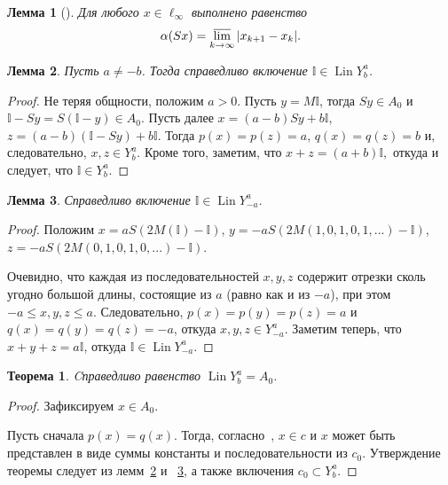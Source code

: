 \documentclass{article}
\theoremstyle{plain}
\newtheorem{lemma}{Лемма}
\newtheorem{theorem}{Теорема}
\theoremstyle{definition}
\newtheorem{proof}{Доказательство}\def\theproof{}
\begin{document}
\begin{fulltext}
\begin{lemma}[{\cite{our-vzms-2018}}]
	Для любого $x\in \ell_\infty$ выполнено равенство
	\begin{equation*}
		\alpha(Sx) = \varlimsup_{k\to\infty} |x_{k+1} - x_{k}|
		.
	\end{equation*}
\end{lemma}

\begin{lemma}
	\label{lem:const_Lin_alpha_0}
	Пусть $a\neq -b$.
	Тогда справедливо включение
	$\mathbb{I}\in \operatorname{Lin} Y^a_b$.
\end{lemma}

\begin{proof}
	Не теряя общности, положим $a>0$.
	Пусть $y = M \mathbb{I}$,
	тогда $Sy\in A_0$ и $\mathbb{I}-Sy = S(\mathbb{I}-y)\in A_0$.
	Пусть далее $x=(a-b)Sy+b\mathbb{I}$, $z=(a-b)(\mathbb{I}-Sy)+b\mathbb{I}$.
	Тогда $p(x)=p(z)=a$, $q(x)=q(z)=b$ и, следовательно, $x,z\in Y^a_b$.
	Кроме того, заметим, что
	$
		x+z = (a+b)\mathbb{I}
		,
	$
	откуда и следует, что $\mathbb{I}\in Y^a_b$.
\end{proof}


\begin{lemma}
	\label{lem:const_Lin_alpha_0_a_eq_-b}
	Справедливо включение
	$\mathbb{I}\in \operatorname{Lin} Y^a_{-a}$.
\end{lemma}

\begin{proof}
	Положим $x=aS(2M(\mathbb{I})-\mathbb{I})$,
	$y=-aS(2M(1,0,1,0,1,...)-\mathbb{I})$,
	$z=-aS(2M(0,1,0,1,0,...)-\mathbb{I})$.
	
	Очевидно, что каждая из последовательностей $x,y,z$ содержит отрезки сколь угодно большой длины,
	состоящие из $a$ (равно как и из $-a$), при этом $-a \leq x,y,z \leq a$.
	Следовательно, $p(x)=p(y)=p(z) = a$ и $q(x)=q(y)=q(z) = -a$,
	откуда $x,y,z \in Y^a_{-a}$.
	Заметим теперь, что $x + y + z = a\mathbb{I}$,
	откуда $\mathbb{I} \in \operatorname{Lin} Y^a_{-a}$.
\end{proof}

\begin{theorem}
	\label{thm:A_0_c_infty_lin}
	Cправедливо равенство $\operatorname{Lin} Y^a_b = A_0$.
\end{theorem}

\begin{proof}
	Зафиксируем $x \in A_0$.

	Пусть сначала $p(x) = q(x)$.
	Тогда, согласно~\cite[следствие 2]{our-mz2019ac0}, $x\in c$
	и $x$ может быть представлен в виде суммы константы и последовательности из $c_0$.
	Утверждение теоремы следует из лемм~\ref{lem:const_Lin_alpha_0} и ~\ref{lem:const_Lin_alpha_0_a_eq_-b},
	а также включения $c_0 \subset Y^a_b$.


\end{proof}
\end{fulltext}
\end{document}

